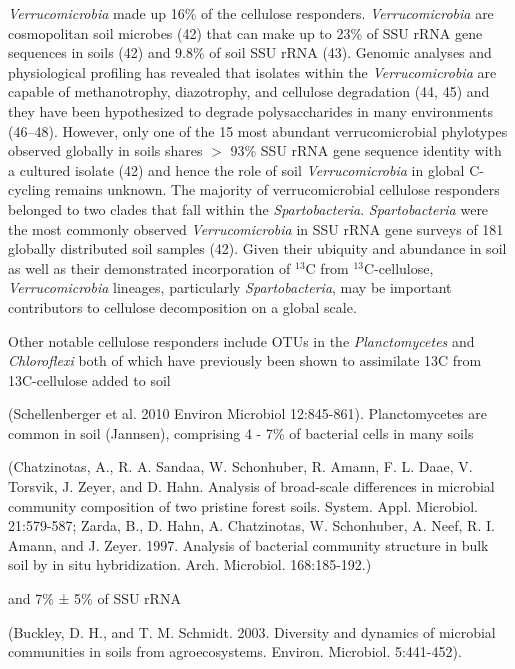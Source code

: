 \textit{Verrucomicrobia} made up 16\% of the cellulose responders.
\textit{Verrucomicrobia} are cosmopolitan soil microbes (42) that can make up
to 23\% of SSU rRNA gene sequences in soils (42) and 9.8\% of soil SSU rRNA
(43). Genomic analyses and physiological profiling has revealed that isolates
within the \textit{Verrucomicrobia} are capable of methanotrophy, diazotrophy,
and cellulose degradation (44, 45) and they have been hypothesized to degrade
polysaccharides in many environments (46–48). However, only one of the
15 most abundant verrucomicrobial phylotypes observed globally in soils shares
$>$ 93\% SSU rRNA gene sequence identity with a cultured isolate (42) and hence
the role of soil \textit{Verrucomicrobia} in global C-cycling remains unknown.
The majority of verrucomicrobial cellulose responders belonged to two clades
that fall within the \textit{Spartobacteria}. \textit{Spartobacteria} were the
most commonly observed \textit{Verrucomicrobia} in SSU rRNA gene surveys of
181 globally distributed soil samples (42). Given their ubiquity and abundance
in soil as well as their demonstrated incorporation of $^{13}$C from
$^{13}$C-cellulose, \textit{Verrucomicrobia} lineages, particularly
\textit{Spartobacteria}, may be important contributors to cellulose
decomposition on a global scale. 

Other notable cellulose responders include OTUs in the \textit{Planctomycetes}
and \textit{Chloroflexi} both of which have previously been shown to
assimilate 13C from 13C-cellulose added to soil 

(Schellenberger et al. 2010 Environ Microbiol 12:845-861). Planctomycetes are
common in soil (Jannsen), comprising 4 - 7\% of bacterial cells in many soils 

(Chatzinotas, A., R. A. Sandaa, W. Schonhuber, R. Amann, F. L. Daae, V.
Torsvik, J. Zeyer, and D. Hahn. Analysis of broad-scale differences in
microbial community composition of two pristine forest soils. System. Appl.
Microbiol. 21:579-587; Zarda, B., D. Hahn, A. Chatzinotas, W. Schonhuber, A.
Neef, R. I. Amann, and J. Zeyer. 1997. Analysis of bacterial community
structure in bulk soil by in situ hybridization. Arch. Microbiol. 168:185-192.)

and 7\% ± 5\% of SSU rRNA 

(Buckley, D. H., and T. M. Schmidt. 2003. Diversity and dynamics of microbial
communities in soils from agroecosystems. Environ. Microbiol.
      5:441-452). 
      
